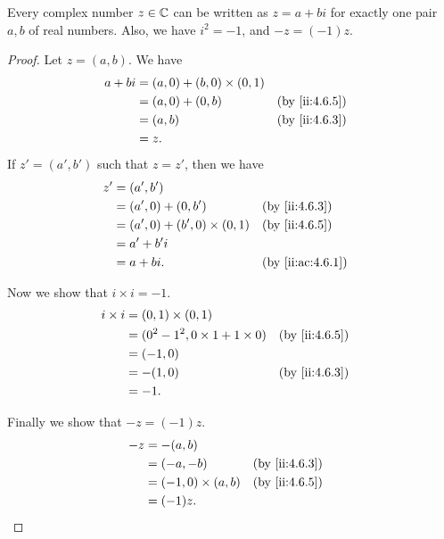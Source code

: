 \begin{lem}\label{ii:4.6.7}
  Every complex number \(z \in \mathbb{C}\) can be written as \(z = a + bi\) for exactly one pair \(a, b\) of real numbers.
  Also, we have \(i^2 = -1\), and \(-z = (-1)z\).
\end{lem}

\begin{proof}
  Let \(z = (a, b)\).
  We have
  \begin{align*}
    a + bi & = (a, 0) + (b, 0) \times (0, 1)                    \\
           & = (a, 0) + (0, b)               &  & \by{ii:4.6.5} \\
           & = (a, b)                        &  & \by{ii:4.6.3} \\
           & = z.
  \end{align*}
  If \(z' = (a', b')\) such that \(z = z'\), then we have
  \begin{align*}
    z' & = (a', b')                                              \\
       & = (a', 0) + (0, b')               &  & \by{ii:4.6.3}    \\
       & = (a', 0) + (b', 0) \times (0, 1) &  & \by{ii:4.6.5}    \\
       & = a' + b' i                                             \\
       & = a + bi.                         &  & \by{ii:ac:4.6.1}
  \end{align*}

  Now we show that \(i \times i = -1\).
  \begin{align*}
    i \times i & = (0, 1) \times (0, 1)                                    \\
               & = (0^2 - 1^2, 0 \times 1 + 1 \times 0) &  & \by{ii:4.6.5} \\
               & = (-1, 0)                                                 \\
               & = -(1, 0)                              &  & \by{ii:4.6.3} \\
               & = -1.
  \end{align*}

  Finally we show that \(-z = (-1) z\).
  \begin{align*}
    -z & = -(a, b)                                  \\
       & = (-a, -b)              &  & \by{ii:4.6.3} \\
       & = (-1, 0) \times (a, b) &  & \by{ii:4.6.5} \\
       & = (-1) z.
  \end{align*}
\end{proof}

